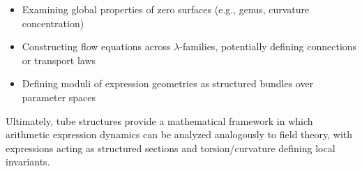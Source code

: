 \begin{itemize}
\item Examining global properties of zero surfaces (e.g., genus, curvature concentration)
\item Constructing flow equations across $\lambda$-families, potentially defining connections or transport laws
\item Defining moduli of expression geometries as structured bundles over parameter spaces
\end{itemize}

Ultimately, tube structures provide a mathematical framework in which arithmetic expression dynamics can be analyzed analogously to field theory, with expressions acting as structured sections and torsion/curvature defining local invariants.
